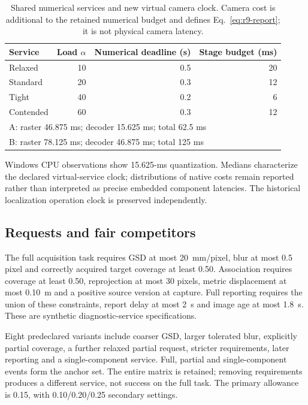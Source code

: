\begin{table}[t]\centering\small
\caption{Shared numerical services and new virtual camera clock. Camera cost is additional to the retained numerical budget and defines Eq.~\eqref{eq:r9-report}; it is not physical camera latency.}\label{tab:r9-services}
\begin{tabular}{@{}lrrr@{}}\toprule
Service & Load $\alpha$ & Numerical deadline (s) & Stage budget (ms)\\\midrule
Relaxed &10&0.5&20\\Standard &20&0.3&12\\Tight &40&0.2&6\\Contended &60&0.3&12\\\midrule
\multicolumn{4}{l}{A: raster 46.875 ms; decoder 15.625 ms; total 62.5 ms}\\
\multicolumn{4}{l}{B: raster 78.125 ms; decoder 46.875 ms; total 125 ms}\\\bottomrule
\end{tabular}
\end{table}
Windows CPU observations show 15.625-ms quantization. Medians characterize the declared virtual-service clock; distributions of native costs remain reported rather than interpreted as precise embedded component latencies. The historical localization operation clock is preserved independently.

\subsection{Requests and fair competitors}
The full acquisition task requires GSD at most 20~mm/pixel, blur at most 0.5 pixel and correctly acquired target coverage at least 0.50. Association requires coverage at least 0.50, reprojection at most 30 pixels, metric displacement at most 0.10~m and a positive source version at capture. Full reporting requires the union of these constraints, report delay at most 2~s and image age at most 1.8~s. These are synthetic diagnostic-service specifications.

Eight predeclared variants include coarser GSD, larger tolerated blur, explicitly partial coverage, a further relaxed partial request, stricter requirements, later reporting and a single-component service. Full, partial and single-component events form the anchor set. The entire matrix is retained; removing requirements produces a different service, not success on the full task. The primary allowance is 0.15, with 0.10/0.20/0.25 secondary settings.

